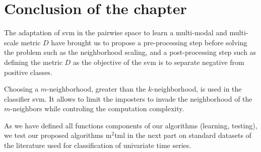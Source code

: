 \section{Conclusion of the chapter}
The adaptation of {\sc svm} in the pairwise space to learn a multi-modal and multi-scale metric $D$ have brought us to propose a pre-processing step before solving the problem such as the neighborhood scaling, and a post-processing step such as defining the metric $D$ as the objective of the {\sc svm} is to separate negative from positive classes.

Choosing a $m$-neighborhood, greater than the $k$-neighborhood, is used in the classifier {\sc svm}. It allows to limit the imposters to invade the neighborhood of the $m$-neighbors while controling the computation complexity.

As we have defined all functions components of our algorithms (learning, testing), we test our proposed algorithms {\sc m}$^2${\sc tml} in the next part on standard datasets of the literature used for classification of univariate time series. 

